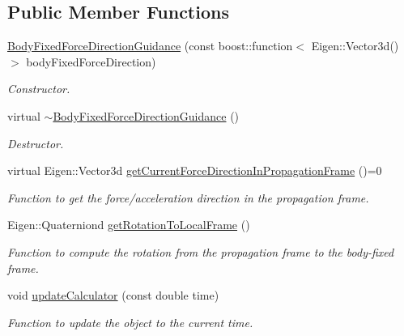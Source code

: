 \subsection*{Public Member Functions}
\begin{DoxyCompactItemize}
\item 
\hyperlink{classtudat_1_1propulsion_1_1BodyFixedForceDirectionGuidance_a18be30cae6aeaabebe4ef5e8fc447fff}{Body\+Fixed\+Force\+Direction\+Guidance} (const boost\+::function$<$ Eigen\+::\+Vector3d() $>$ body\+Fixed\+Force\+Direction)
\begin{DoxyCompactList}\small\item\em Constructor. \end{DoxyCompactList}\item 
virtual \hyperlink{classtudat_1_1propulsion_1_1BodyFixedForceDirectionGuidance_a34c738a626dced8c464072c23cd272d8}{$\sim$\+Body\+Fixed\+Force\+Direction\+Guidance} ()\hypertarget{classtudat_1_1propulsion_1_1BodyFixedForceDirectionGuidance_a34c738a626dced8c464072c23cd272d8}{}\label{classtudat_1_1propulsion_1_1BodyFixedForceDirectionGuidance_a34c738a626dced8c464072c23cd272d8}

\begin{DoxyCompactList}\small\item\em Destructor. \end{DoxyCompactList}\item 
virtual Eigen\+::\+Vector3d \hyperlink{classtudat_1_1propulsion_1_1BodyFixedForceDirectionGuidance_a4284988acc53bfac7681ebd44c876e74}{get\+Current\+Force\+Direction\+In\+Propagation\+Frame} ()=0
\begin{DoxyCompactList}\small\item\em Function to get the force/acceleration direction in the propagation frame. \end{DoxyCompactList}\item 
Eigen\+::\+Quaterniond \hyperlink{classtudat_1_1propulsion_1_1BodyFixedForceDirectionGuidance_a4d00bda9b8e058f61be0589e0808989a}{get\+Rotation\+To\+Local\+Frame} ()
\begin{DoxyCompactList}\small\item\em Function to compute the rotation from the propagation frame to the body-\/fixed frame. \end{DoxyCompactList}\item 
void \hyperlink{classtudat_1_1propulsion_1_1BodyFixedForceDirectionGuidance_a9c68637d16f973b22f5b06ee3aea1031}{update\+Calculator} (const double time)
\begin{DoxyCompactList}\small\item\em Function to update the object to the current time. \end{DoxyCompactList}\end{DoxyCompactItemize}
